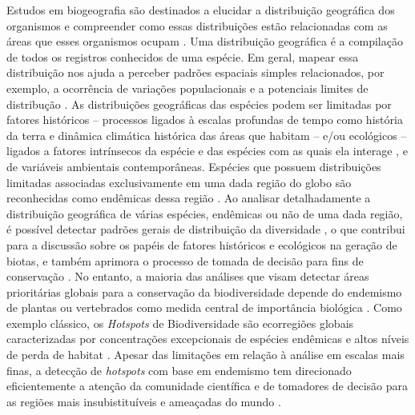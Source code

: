 \documentclass[12pt,openright,oneside,a4paper,english]{abntex2}
\begin{document}
Estudos em biogeografia são destinados a elucidar a distribuição geográfica dos organismos e compreender como essas distribuições estão relacionadas com as áreas que esses organismos ocupam \citep{Carvalho2016}. Uma distribuição geográfica é a compilação de todos os registros conhecidos de uma espécie. Em geral, mapear essa distribuição nos ajuda a perceber padrões espaciais simples relacionados, por exemplo, a ocorrência de variações populacionais e a potenciais limites de distribução \citep{Gaston2003}. As distribuições geográficas das espécies podem ser limitadas por fatores históricos – processos ligados à escalas profundas de tempo como história da terra e dinâmica climática histórica das áreas que habitam – e/ou ecológicos – ligados a fatores intrínsecos da espécie e das espécies com as quais ela interage \citep{Cox2016}, e de variáveis ambientais contemporâneas. Espécies que possuem distribuições limitadas associadas exclusivamente em uma dada região do globo são reconhecidas como endêmicas dessa região \citep{Cox2016}. Ao analisar detalhadamente a distribuição geográfica de várias espécies, endêmicas ou não de uma dada região, é possível detectar padrões gerais de distribuição da diversidade \citep{Brown1995}, o que contribui para a discussão sobre os papéis de fatores históricos e ecológicos na geração de biotas, e também aprimora o processo de tomada de decisão para fins de conservação \citep{Hausdorf2002, Whittaker2005}. No entanto, a maioria das análises que visam detectar áreas prioritárias globais para a conservação da biodiversidade depende do endemismo de plantas ou vertebrados como medida central de importância biológica \citep{Brooks2006}. Como exemplo clássico, os \textit{Hotspots} de Biodiversidade são ecorregiões globais caracterizadas por concentrações excepcionais de espécies endêmicas e altos níveis de perda de habitat \citep{Myers2000}. Apesar das limitações em relação à análise em escalas mais finas, a detecção de \textit{hotspots} com base em endemismo tem direcionado eficientemente a atenção da comunidade científica e de tomadores de decisão para as regiões mais insubistituíveis e ameaçadas do mundo \citep{Reid1998, Brooks2006}.
\end{document}
